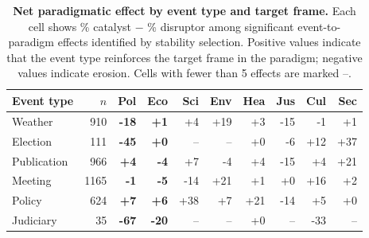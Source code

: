 \begin{table}[h]
\centering
\renewcommand{\arraystretch}{1.15}
\caption{\textbf{Net paradigmatic effect by event type and target frame.}
Each cell shows \% catalyst $-$ \% disruptor among significant
event-to-paradigm effects identified by stability selection.
Positive values indicate that the event type reinforces
the target frame in the paradigm; negative values indicate erosion.
Cells with fewer than 5 effects are marked --.}
\label{tab:si_paradigm_impact}
\vspace{0.3em}
\footnotesize
\begin{tabular}{@{}l r r r r r r r r r@{}}
\toprule
Event type & $n$ & \textbf{Pol} & \textbf{Eco} & Sci & Env & Hea & Jus & Cul & Sec \\
\midrule
Weather & 910 & \textbf{-18} & \textbf{+1} & +4 & +19 & +3 & -15 & -1 & +1 \\
Election & 111 & \textbf{-45} & \textbf{+0} & -- & -- & +0 & -6 & +12 & +37 \\
Publication & 966 & \textbf{+4} & \textbf{-4} & +7 & -4 & +4 & -15 & +4 & +21 \\
Meeting & 1165 & \textbf{-1} & \textbf{-5} & -14 & +21 & +1 & +0 & +16 & +2 \\
Policy & 624 & \textbf{+7} & \textbf{+6} & +38 & +7 & +21 & -14 & +5 & +0 \\
Judiciary & 35 & \textbf{-67} & \textbf{-20} & -- & -- & +0 & -- & -33 & -- \\
\bottomrule
\end{tabular}
\end{table}